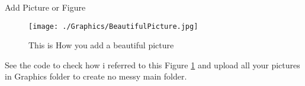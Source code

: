 \documentclass[aspectratio=169, 9pt]{beamer}
\begin{document}
\begin{frame}{Add Picture or Figure}
        \begin{minipage}[t]{\linewidth}
            \begin{center}
            \begin{figure}
                \centering
                \texttt{[image: ./Graphics/BeautifulPicture.jpg]}
             \caption{This is How you add a beautiful picture}
                \label{BFigure1} %
            \end{figure}
            \end{center}
        \end{minipage}
        See the code to check how i referred to this Figure \ref{BFigure1} and upload all your pictures in Graphics folder to create no messy main folder.
\end{frame}

%
%
\end{document}

